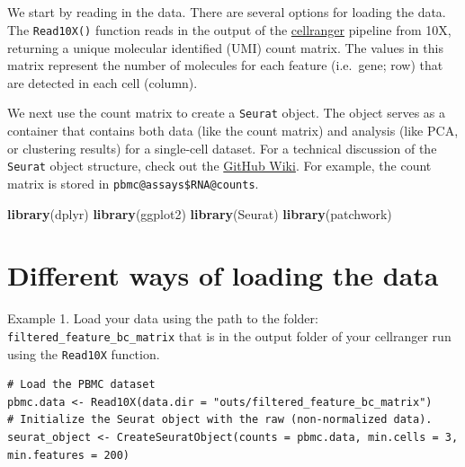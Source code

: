 \documentclass[
]{book}
\newenvironment{Shaded}{\begin{snugshade}}{\end{snugshade}}
\newcommand{\FunctionTok}[1]{\textcolor[rgb]{0.13,0.29,0.53}{\textbf{#1}}}
\newcommand{\NormalTok}[1]{#1}
\begin{document}
\hypertarget{section}{%
\subsection*{}\label{section}}

We start by reading in the data. There are several options for loading the data. The \texttt{Read10X()} function reads in the output of the \href{https://support.10xgenomics.com/single-cell-gene-expression/software/pipelines/latest/what-is-cell-ranger}{cellranger} pipeline from 10X, returning a unique molecular identified (UMI) count matrix. The values in this matrix represent the number of molecules for each feature (i.e.~gene; row) that are detected in each cell (column).

We next use the count matrix to create a \texttt{Seurat} object. The object serves as a container that contains both data (like the count matrix) and analysis (like PCA, or clustering results) for a single-cell dataset. For a technical discussion of the \texttt{Seurat} object structure, check out the \href{https://github.com/satijalab/seurat/wiki}{GitHub Wiki}. For example, the count matrix is stored in \texttt{pbmc@assays\$RNA@counts}.

\begin{Shaded}
\begin{Highlighting}[]
\FunctionTok{library}\NormalTok{(dplyr)}
\FunctionTok{library}\NormalTok{(ggplot2)}
\FunctionTok{library}\NormalTok{(Seurat)}
\FunctionTok{library}\NormalTok{(patchwork)}
\end{Highlighting}
\end{Shaded}

\hypertarget{different-ways-of-loading-the-data}{%
\section{Different ways of loading the data}\label{different-ways-of-loading-the-data}}

Example 1. Load your data using the path to the folder: \texttt{filtered\_feature\_bc\_matrix} that is in the output folder of your cellranger run using the \texttt{Read10X} function.

\begin{verbatim}
# Load the PBMC dataset
pbmc.data <- Read10X(data.dir = "outs/filtered_feature_bc_matrix")
# Initialize the Seurat object with the raw (non-normalized data).
seurat_object <- CreateSeuratObject(counts = pbmc.data, min.cells = 3, min.features = 200)
\end{verbatim}
\end{document}
